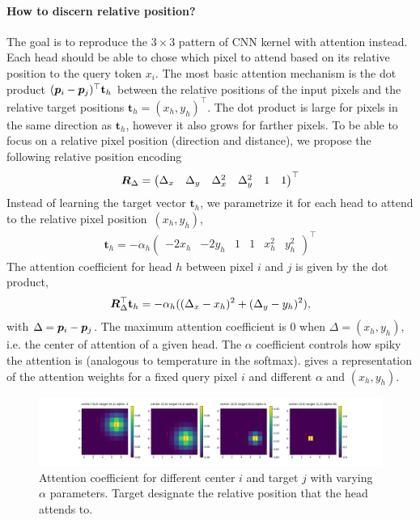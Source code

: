 \documentclass{article} %
\begin{document}
\paragraph{How to discern relative position?} The goal is to reproduce the $3\times 3$ pattern of CNN kernel with attention instead.
Each head should be able to chose which pixel to attend based on its relative position to the query token $x_i$.
The most basic attention mechanism is the dot product $({\bm{p}}_i - {\bm{p}}_j)^\top \mathbf{t}_h$ between the relative positions of the input pixels and the relative target positions $\mathbf{t}_h = (x_h, y_h)^\top$.
The dot product is large for pixels in the same direction as $\mathbf{t}_h$, however it also grows for farther pixels. To be able to focus on a relative pixel position (direction and distance), we propose the following relative position encoding
\begin{align}
  {\bm{R}}_{\Delta} = 
  \begin{pmatrix} 
  \Delta_x& \Delta_y& \Delta_x^2& \Delta_y^2& 1& 1
  \end{pmatrix}^\top
\end{align}
Instead of learning the target vector $\mathbf{t}_h$, we parametrize it for each head to attend to the relative pixel position~$(x_h, y_h)$,
\begin{align}
  \mathbf{t}_h= 
  -\alpha_h \begin{pmatrix} 
  -2 x_h& -2 y_h& 1& 1&  x_h^2&  y_h^2
  \end{pmatrix}^\top
\end{align}
The attention coefficient for head $h$ between pixel $i$ and $j$ is given by the dot product,
\begin{align}
  {\bm{R}}_{\Delta}^\top \mathbf{t}_h = -\alpha_h ( (\Delta_x - x_h)^2 + (\Delta_y - y_h) ^2 ),
\end{align}
with $\Delta = {\bm{p}}_i - {\bm{p}}_j$. 
The maximum attention coefficient is 0 when $\Delta = (x_h, y_h)$, i.e. the center of attention of a given head.
The $\alpha$ coefficient controls how spiky the attention is (analogous to temperature in the softmax).
 gives a representation of the attention weights for a fixed query pixel $i$ and different $\alpha$ and $(x_h, y_h)$.

\begin{figure}[h]
  \centering
  \includegraphics[width=1\linewidth]{plots/conv_attention.pdf}
  \caption{Attention coefficient for different center $i$ and target $j$ with varying $\alpha$ parameters. Target designate the relative position that the head attends to.}
  \label{fig:attention_cnn}
\end{figure}
\end{document}
